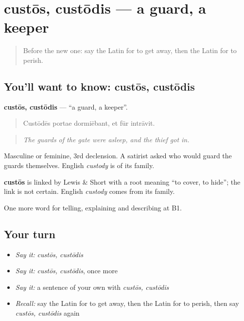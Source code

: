 \section[custōs, custōdis]{custōs, custōdis — a guard, a keeper}

\label{lesson:LA-C322-custos}



\begin{quote}
Before the new one: say the Latin for to get away, then the Latin for to perish.
\end{quote}

\subsection*{You'll want to know: custōs, custōdis}
\textbf{custōs, custōdis} — \textquotedblleft{}a guard, a keeper\textquotedblright{}.

\begin{quote}
Custōdēs portae dormiēbant, et fūr intrāvit.
\end{quote}

\begin{quote}
\emph{The guards of the gate were asleep, and the thief got in.}
\end{quote}

Masculine or feminine, 3rd declension. A satirist asked who would guard the guards themselves. English \emph{custody} is of its family.

\begin{cousinweb}
\textbf{custōs} is linked by Lewis \& Short with a root meaning \textquotedblleft{}to cover, to hide\textquotedblright{}; the link is not certain. English \emph{custody} comes from its family.
\end{cousinweb}

\begin{grammarlens}[title={What you've built}]
One more word for telling, explaining and describing at B1.
\end{grammarlens}

\subsection*{Your turn}
\begin{itemize}
\raggedright
  \item \emph{Say it:} \emph{custōs, custōdis}
  \item \emph{Say it:} \emph{custōs, custōdis}, once more
  \item \emph{Say it:} a sentence of your own with \emph{custōs, custōdis}
  \item \emph{Recall:} say the Latin for to get away, then the Latin for to perish, then say \emph{custōs, custōdis} again
\end{itemize}


